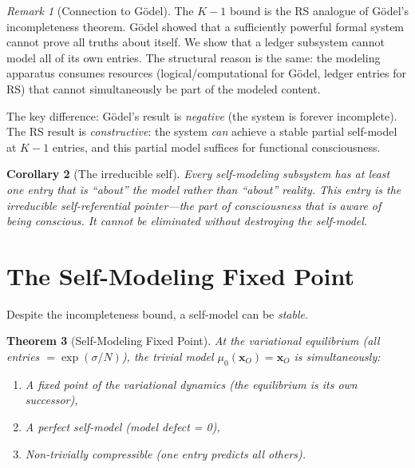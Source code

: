 \documentclass[11pt,a4paper]{article}
\theoremstyle{plain}
\newtheorem{theorem}{Theorem}[section]
\newtheorem{corollary}[theorem]{Corollary}
\theoremstyle{definition}
\theoremstyle{remark}
\newtheorem{remark}[theorem]{Remark}
\begin{document}
\begin{remark}[Connection to G\"odel]
The $K - 1$ bound is the RS analogue of G\"odel's incompleteness theorem.
G\"odel showed that a sufficiently powerful formal system cannot prove
all truths about itself.  We show that a ledger subsystem cannot model
all of its own entries.  The structural reason is the same: the modeling
apparatus consumes resources (logical/computational for G\"odel,
ledger entries for RS) that cannot simultaneously be part of the
modeled content.

The key difference: G\"odel's result is \emph{negative} (the system is
forever incomplete).  The RS result is \emph{constructive}: the system
\emph{can} achieve a stable partial self-model at $K - 1$ entries, and
this partial model suffices for functional consciousness.
\end{remark}

\begin{corollary}[The irreducible self]
Every self-modeling subsystem has at least one entry that is ``about''
the model rather than ``about'' reality.  This entry is the irreducible
self-referential pointer---the part of consciousness that is aware of
being conscious.  It cannot be eliminated without destroying the
self-model.
\end{corollary}

\section{The Self-Modeling Fixed Point}
\label{sec:fixed-point}

Despite the incompleteness bound, a self-model can be \emph{stable}.

\begin{theorem}[Self-Modeling Fixed Point]
\label{thm:fixed-point}
At the variational equilibrium (all entries $= \exp(\sigma/N)$), the
trivial model $\mu_0(\mathbf{x}_O) = \mathbf{x}_O$ is simultaneously:
\begin{enumerate}[nosep,label=(\alph*)]
\item A fixed point of the variational dynamics (the equilibrium
  is its own successor),
\item A perfect self-model (model defect = 0),
\item Non-trivially compressible (one entry predicts all others).
\end{enumerate}
\end{theorem}
\end{document}
